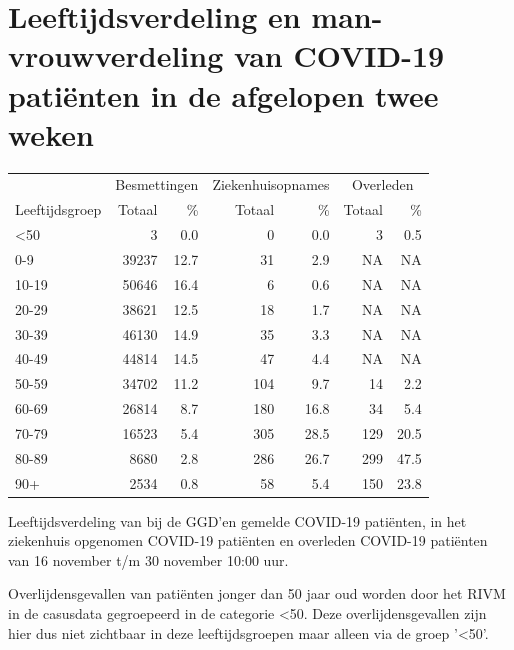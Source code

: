 \documentclass[
  english,
  man,floatsintext]{apa6}
\begin{document}
\hypertarget{leeftijdsverdeling-en-man-vrouwverdeling-van-covid-19-patiuxebnten-in-de-afgelopen-twee-weken}{%
\section{Leeftijdsverdeling en man-vrouwverdeling van COVID-19 patiënten in de afgelopen twee weken}\label{leeftijdsverdeling-en-man-vrouwverdeling-van-covid-19-patiuxebnten-in-de-afgelopen-twee-weken}}

\begin{table}
\centering\begingroup\fontsize{11}{13}\selectfont

\begin{threeparttable}
\begin{tabular}{lrrrrrr}
\toprule
\multicolumn{1}{c}{ } & \multicolumn{2}{c}{Besmettingen} & \multicolumn{2}{c}{Ziekenhuisopnames} & \multicolumn{2}{c}{Overleden} \\
\cmidrule(l{3pt}r{3pt}){2-3} \cmidrule(l{3pt}r{3pt}){4-5} \cmidrule(l{3pt}r{3pt}){6-7}
Leeftijdsgroep & Totaal & \% & Totaal & \% & Totaal & \%\\
\midrule
<50 & 3 & 0.0 & 0 & 0.0 & 3 & 0.5\\
0-9 & 39237 & 12.7 & 31 & 2.9 & NA & NA\\
10-19 & 50646 & 16.4 & 6 & 0.6 & NA & NA\\
20-29 & 38621 & 12.5 & 18 & 1.7 & NA & NA\\
30-39 & 46130 & 14.9 & 35 & 3.3 & NA & NA\\
40-49 & 44814 & 14.5 & 47 & 4.4 & NA & NA\\
50-59 & 34702 & 11.2 & 104 & 9.7 & 14 & 2.2\\
60-69 & 26814 & 8.7 & 180 & 16.8 & 34 & 5.4\\
70-79 & 16523 & 5.4 & 305 & 28.5 & 129 & 20.5\\
80-89 & 8680 & 2.8 & 286 & 26.7 & 299 & 47.5\\
90+ & 2534 & 0.8 & 58 & 5.4 & 150 & 23.8\\
\bottomrule
\end{tabular}
\begin{tablenotes}
\item[1] Leeftijdsverdeling van bij de GGD’en gemelde COVID-19 patiënten, in het ziekenhuis opgenomen COVID-19 patiënten en overleden COVID-19 patiënten van 16 november t/m 30 november 10:00 uur.
\item[2] Overlijdensgevallen van patiënten jonger dan 50 jaar oud worden door het RIVM in de casusdata gegroepeerd in de categorie <50. Deze overlijdensgevallen zijn hier dus niet zichtbaar in deze leeftijdsgroepen maar alleen via de groep '<50'.
\end{tablenotes}
\end{threeparttable}
\endgroup{}
\end{table}
\end{document}
